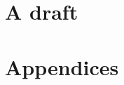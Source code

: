 \documentclass[letter,10pt,openany]{article}
\begin{document}

\maketitle
\thispagestyle{empty}
\tableofcontents

\chapter{A draft}





\appendix
\chapter{Appendices}
% 




\end{document}
